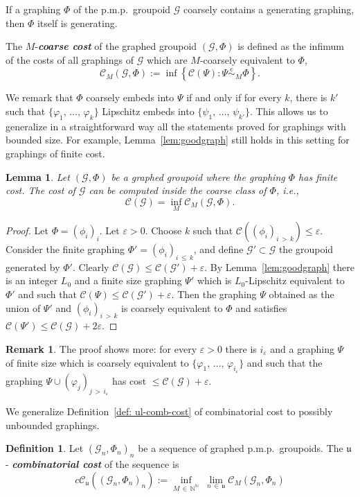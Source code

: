 \documentclass[10pt]{amsart}
\newtheorem{lemm}[cdrthm]{Lemma}
\theoremstyle{definition}
\newtheorem{rema}[cdrthm]{Remark}
\newtheorem{defi}[cdrthm]{Definition}
\newcommand{\defin}[1]{\textbf{\emph{#1}}}
\newcommand{\Nmath}{\mathbb{N}}
\newcommand{\cost}{\mathcal{C}}
\newcommand{\ccost}{c\mathcal{C}}
\newcommand{\cg}{\mathcal{G}}
\newcommand{\ul}{\mathfrak{u}}
\newcommand{\eps}{\varepsilon}
\newcommand{\ph}{\varphi}
\newcommand{\pmp}{p.m.p.\ }
\newcommand\ceq{\overset{c}{\sim}}
\begin{document}
If a graphing $\Phi$ of the \pmp groupoid $\cg$ coarsely contains a generating graphing, then $\Phi$ itself is generating.

The $M$-\defin{coarse cost} of the graphed groupoid $(\cg,\Phi)$ is defined as the infimum of the costs of all graphings of $\cg$ which are $M$-coarsely equivalent to $\Phi$,
\[
\cost_M(\cg,\Phi):=\inf\left\{\cost(\Psi)\colon \Psi\ceq_M\Phi \right\}.
\]

We remark that $\Phi$ coarsely embeds into $\Psi$ if and only if for every $k$, there is $k'$ such that $\{\ph_1,\,\dots,\,\ph_k\}$ Lipschitz embeds into $\{\psi_1,\,\dots,\,\psi_{k'}\}$. This allows us to generalize in a straightforward way all the statements proved for graphings with bounded size. For example, Lemma~\ref{lem:goodgraph} still holds in this setting for graphings of finite cost.

\begin{lemm}\label{lem:goodgraphcoarse}
Let $(\cg,\Phi)$ be a graphed groupoid where the graphing $\Phi$ has finite cost. The cost of $\cg$ can be computed inside the coarse class of $\Phi$, i.e.,
\begin{equation}
\cost(\cg)=\inf_M\cost_M(\cg,\Phi).
\end{equation}
\end{lemm}
\begin{proof}
Let $\Phi=(\phi_i)_i$. Let $\eps>0$. Choose $k$ such that $\cost((\phi_i)_{i\,>\,k}) \leq \eps$. Consider the finite graphing $\Phi'=(\phi_i)_{i\,\leq\,k}$, and define $\cg' \subset \cg$ the groupoid generated by $\Phi'$. Clearly $\cost(\cg) \leq \cost(\cg')+\eps$. By Lemma~\ref{lem:goodgraph} there is an integer $L_0$ and a finite size graphing $\Psi'$ which is $L_0$-Lipschitz equivalent to $\Phi'$ and such that $\cost(\Psi) \leq \cost(\cg')+\varepsilon$. Then the graphing $\Psi$ obtained as the union of $\Psi'$ and $(\phi_i)_{i\,>\,k}$ is coarsely equivalent to $\Phi$ and satisfies $\cost(\Psi') \leq \cost(\cg)+2\varepsilon$.
\end{proof}

\begin{rema}\label{rem:goodgraphcoarse}
The proof shows more: for every $\varepsilon>0$ there is $i_\varepsilon$ and a graphing $\Psi$ of finite size which is coarsely equivalent to $\{\ph_1,\,\dots,\,\ph_{i_\varepsilon}\}$ and such that the graphing $\Psi \cup (\ph_j)_{j\,>\,i_\varepsilon}$ has cost $\leq \cost(\cg)+\varepsilon$.
\end{rema}

We generalize Definition~\ref{def: ul-comb-cost} of combinatorial cost to possibly unbounded graphings.
\begin{defi}\label{def: comb cost, infinite size}
Let $(\cg_n,\Phi_n)_n$ be a sequence of graphed \pmp groupoids. The $\ul$-
\defin{combinatorial cost} of the sequence is
\begin{equation}
\ccost_\ul((\cg_n,\Phi_n)_n):=\inf_{M\,\in\,\Nmath^\Nmath}\;\lim_{n\,\in\,\ul}\cost_M(\cg_n,\Phi_n)
\end{equation}
\end{defi}
\end{document}
